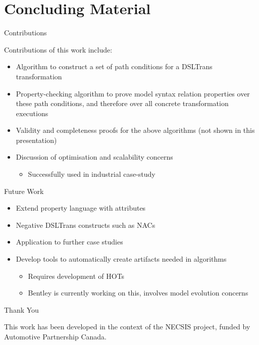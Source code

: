 \documentclass[xcolor=dvipsnames, 14pt]{beamer}
\begin{document}
\section{Concluding Material}
\begin{frame}{Contributions}

Contributions of this work include:
\begin{itemize}
\item Algorithm to construct a set of path conditions for a DSLTrans transformation
\item Property-checking algorithm to prove model syntax relation properties over these path conditions, and therefore over all concrete transformation executions
\item Validity and completeness proofs for the above algorithms (not shown in this presentation)
\item Discussion of optimisation and scalability concerns
\begin{itemize}
\item Successfully used in industrial case-study
\end{itemize}
\end{itemize}

\end{frame}


\begin{frame}{Future Work}

\begin{itemize}
\item Extend property language with attributes 
\item Negative DSLTrans constructs such as NACs
\item Application to further case studies
\item Develop tools to automatically create artifacts needed in algorithms
\begin{itemize}
\item Requires development of HOTs
\item Bentley is currently working on this, involves model evolution concerns
\end{itemize}
\end{itemize}

\end{frame}

\begin{frame}{Thank You}

This work has been developed in the context of the NECSIS project, funded by Automotive Partnership Canada.


\end{frame}
\end{document}
